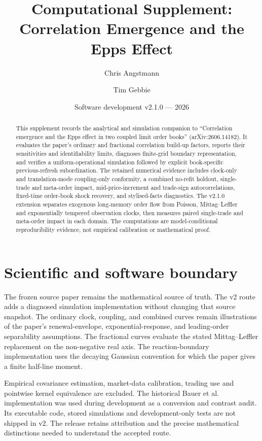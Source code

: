 \documentclass[11pt]{article}
\title{Computational Supplement:\\Correlation Emergence and the Epps Effect}
\author{Chris Angstmann \and Tim Gebbie}
\date{Software development v2.1.0 --- 2026}
\begin{document}
\maketitle

\begin{abstract}
This supplement records the analytical and simulation companion to ``Correlation emergence and the Epps effect in two coupled limit order books'' (arXiv:2606.14182). It evaluates the paper's ordinary and fractional correlation build-up factors, reports their sensitivities and identifiability limits, diagnoses finite-grid boundary representation, and verifies a uniform-operational simulation followed by explicit book-specific previous-refresh subordination. The retained numerical evidence includes clock-only and translation-mode coupling-only conformity, a combined no-refit holdout, single-trade and meta-order impact, mid-price-increment and trade-sign autocorrelations, fixed-time order-book shock recovery, and stylised-facts diagnostics. The v2.1.0 extension separates exogenous long-memory order flow from Poisson, Mittag--Leffler and exponentially tempered observation clocks, then measures paired single-trade and meta-order impact in each domain. The computations are model-conditional reproducibility evidence, not empirical calibration or mathematical proof.
\end{abstract}

\tableofcontents

\section{Scientific and software boundary}

The frozen source paper remains the mathematical source of truth. The v2 route adds a diagnosed simulation implementation without changing that source snapshot. The ordinary clock, coupling, and combined curves remain illustrations of the paper's renewal-envelope, exponential-response, and leading-order separability assumptions. The fractional curves evaluate the stated Mittag--Leffler replacement on the non-negative real axis. The reaction-boundary implementation uses the decaying Gaussian convention for which the paper gives a finite half-line moment.

Empirical covariance estimation, market-data calibration, trading use and pointwise kernel equivalence are excluded. The historical Bauer et al. implementation was used during development as a conversion and contrast audit. Its executable code, stored simulations and development-only tests are not shipped in v2. The release retains attribution and the precise mathematical distinctions needed to understand the accepted route.
\end{document}
